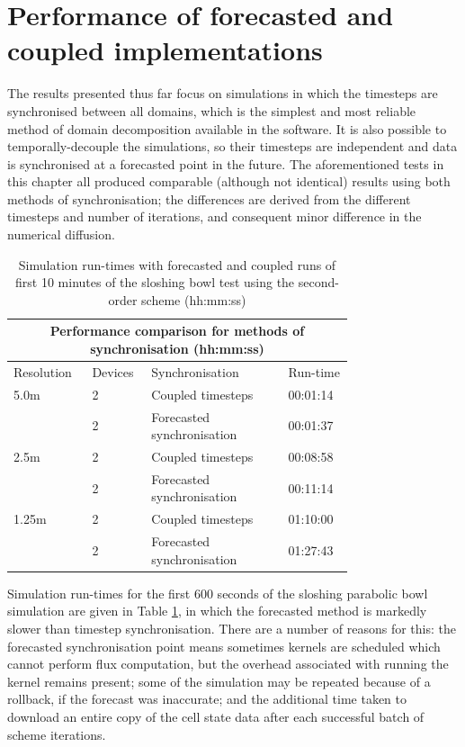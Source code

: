 \section{Performance of forecasted and coupled implementations}

The results presented thus far focus on simulations in which the timesteps are synchronised between all domains, which is the simplest and most reliable method of domain decomposition available in the software. It is also possible to temporally-decouple the simulations, so their timesteps are independent and data is synchronised at a forecasted point in the future. The aforementioned tests in this chapter all produced comparable (although not identical) results using both methods of synchronisation; the differences are derived from the different timesteps and number of iterations, and consequent minor difference in the numerical diffusion. 

\begin{table}[p]
	\small
	\centering
	\caption{Simulation run-times with forecasted and coupled runs of first 10 minutes of the sloshing bowl test using the second-order scheme (hh:mm:ss)}
	\label{PerformanceResults_MultiGPU_ForecastMethods}
	\begin{tabular}{p{0.15\linewidth}p{0.1\linewidth}p{0.35\linewidth}p{0.15\linewidth}}
		\hline
		\multicolumn{4}{c}{\textbf{Performance comparison for methods of synchronisation (hh:mm:ss)}} \\
		\hline
		Resolution		 	& Devices	& Synchronisation				& Run-time \\
		\hline
		5.0m				& 2			& Coupled timesteps				& 00:01:14 	\\
							& 2			& Forecasted synchronisation	& 00:01:37	\\
		\hline
		2.5m				& 2			& Coupled timesteps				& 00:08:58	\\
							& 2			& Forecasted synchronisation	& 00:11:14	\\
		\hline
		1.25m				& 2			& Coupled timesteps				& 01:10:00	\\
							& 2			& Forecasted synchronisation	& 01:27:43	\\
		\hline
	\end{tabular}
\end{table}

Simulation run-times for the first 600 seconds of the sloshing parabolic bowl simulation are given in Table \ref{PerformanceResults_MultiGPU_ForecastMethods}, in which the forecasted method is markedly slower than timestep synchronisation. There are a number of reasons for this: the forecasted synchronisation point means sometimes kernels are scheduled which cannot perform flux computation, but the overhead associated with running the kernel remains present; some of the simulation may be repeated because of a rollback, if the forecast was inaccurate; and the additional time taken to download an entire copy of the cell state data after each successful batch of scheme iterations. 


